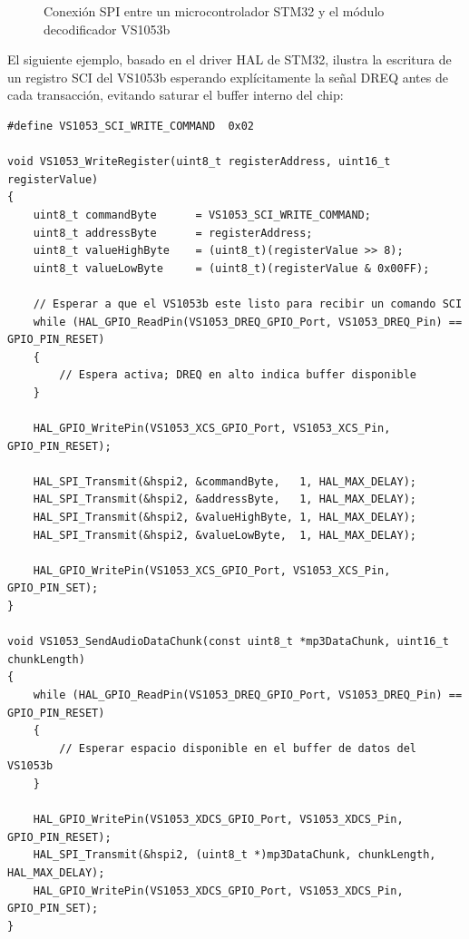 \documentclass[pdflatex,sn-mathphys-num]{sn-jnl}%
\begin{document}

\begin{figure}[!h]
    \centering
    \caption{Conexión SPI entre un microcontrolador STM32 y el módulo decodificador VS1053b}
    \label{fig:vs1053_wiring}
\end{figure}

El siguiente ejemplo, basado en el driver HAL de STM32, ilustra la escritura de un registro SCI del VS1053b esperando explícitamente la señal DREQ antes de cada transacción, evitando saturar el buffer interno del chip:

\begin{lstlisting}[style=algorithmstyle]
#define VS1053_SCI_WRITE_COMMAND  0x02

void VS1053_WriteRegister(uint8_t registerAddress, uint16_t registerValue)
{
    uint8_t commandByte      = VS1053_SCI_WRITE_COMMAND;
    uint8_t addressByte      = registerAddress;
    uint8_t valueHighByte    = (uint8_t)(registerValue >> 8);
    uint8_t valueLowByte     = (uint8_t)(registerValue & 0x00FF);

    // Esperar a que el VS1053b este listo para recibir un comando SCI
    while (HAL_GPIO_ReadPin(VS1053_DREQ_GPIO_Port, VS1053_DREQ_Pin) == GPIO_PIN_RESET)
    {
        // Espera activa; DREQ en alto indica buffer disponible
    }

    HAL_GPIO_WritePin(VS1053_XCS_GPIO_Port, VS1053_XCS_Pin, GPIO_PIN_RESET);

    HAL_SPI_Transmit(&hspi2, &commandByte,   1, HAL_MAX_DELAY);
    HAL_SPI_Transmit(&hspi2, &addressByte,   1, HAL_MAX_DELAY);
    HAL_SPI_Transmit(&hspi2, &valueHighByte, 1, HAL_MAX_DELAY);
    HAL_SPI_Transmit(&hspi2, &valueLowByte,  1, HAL_MAX_DELAY);

    HAL_GPIO_WritePin(VS1053_XCS_GPIO_Port, VS1053_XCS_Pin, GPIO_PIN_SET);
}

void VS1053_SendAudioDataChunk(const uint8_t *mp3DataChunk, uint16_t chunkLength)
{
    while (HAL_GPIO_ReadPin(VS1053_DREQ_GPIO_Port, VS1053_DREQ_Pin) == GPIO_PIN_RESET)
    {
        // Esperar espacio disponible en el buffer de datos del VS1053b
    }

    HAL_GPIO_WritePin(VS1053_XDCS_GPIO_Port, VS1053_XDCS_Pin, GPIO_PIN_RESET);
    HAL_SPI_Transmit(&hspi2, (uint8_t *)mp3DataChunk, chunkLength, HAL_MAX_DELAY);
    HAL_GPIO_WritePin(VS1053_XDCS_GPIO_Port, VS1053_XDCS_Pin, GPIO_PIN_SET);
}
\end{lstlisting}
\end{document}
